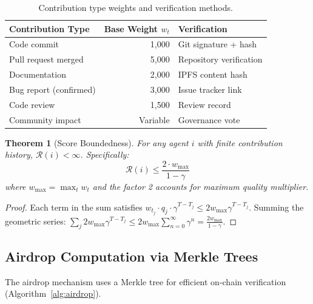 \documentclass{article}
\newtheorem{theorem}{Theorem}
\begin{document}
\begin{table}[t]
\centering
\begin{tabular}{lrl}
\toprule
\textbf{Contribution Type} & \textbf{Base Weight} $w_t$ & \textbf{Verification} \\
\midrule
Code commit & 1,000 & Git signature + hash \\
Pull request merged & 5,000 & Repository verification \\
Documentation & 2,000 & IPFS content hash \\
Bug report (confirmed) & 3,000 & Issue tracker link \\
Code review & 1,500 & Review record \\
Community impact & Variable & Governance vote \\
\bottomrule
\end{tabular}
\caption{Contribution type weights and verification methods.}
\label{tab:weights}
\end{table}

\begin{theorem}[Score Boundedness]\label{thm:bounded}
For any agent $i$ with finite contribution history, $\mathcal{R}(i) < \infty$. Specifically:
\begin{equation}
    \mathcal{R}(i) \leq \frac{2 \cdot w_{\max}}{1 - \gamma}
\end{equation}
where $w_{\max} = \max_t w_t$ and the factor 2 accounts for maximum quality multiplier.
\end{theorem}

\begin{proof}
Each term in the sum satisfies $w_{t_j} \cdot q_j \cdot \gamma^{T-T_j} \leq 2 w_{\max} \gamma^{T-T_j}$. Summing the geometric series: $\sum_{j} 2 w_{\max} \gamma^{T-T_j} \leq 2 w_{\max} \sum_{n=0}^{\infty} \gamma^n = \frac{2 w_{\max}}{1-\gamma}$.
\end{proof}

\subsection{Airdrop Computation via Merkle Trees}

The airdrop mechanism uses a Merkle tree for efficient on-chain verification (Algorithm~\ref{alg:airdrop}).
\end{document}
